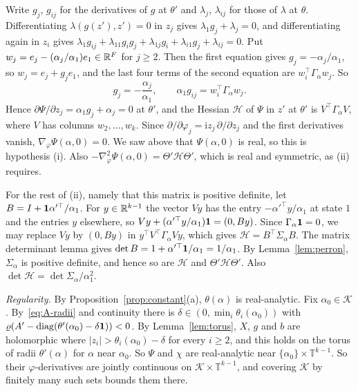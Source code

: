 Write $g_j$, $g_{ij}$ for the derivatives of $g$ at $\theta'$ and
$\lambda_j$, $\lambda_{ij}$ for those of $\lambda$ at $\theta$.
Differentiating $\lambda(g(z'),z')=0$ in $z_j$ gives
$\lambda_1g_j+\lambda_j=0$, and differentiating again in $z_i$ gives
$\lambda_1g_{ij}+\lambda_{11}g_ig_j+\lambda_{1j}g_i+\lambda_{i1}g_j
+\lambda_{ij}=0$. Put $w_j=e_j-(\alpha_j/\alpha_1)e_1\in\mathbb{R}^F$ for $j\ge2$.
Then the first equation gives $g_j=-\alpha_j/\alpha_1$, so $w_j=e_j+g_je_1$,
and the last four terms of the second equation are
$w_i^\top\Gamma_\alpha w_j$. So
\[
g_j=-\frac{\alpha_j}{\alpha_1},\qquad \alpha_1g_{ij}=w_i^\top\Gamma_\alpha w_j .
\]
Hence $\partial\Psi/\partial z_j=\alpha_1g_j+\alpha_j=0$ at $\theta'$, and the
Hessian $\mathcal H$ of $\Psi$ in $z'$ at $\theta'$ is $V^\top\Gamma_\alpha V$,
where $V$ has columns $w_2,\dots,w_k$. Since
$\partial/\partial\varphi_j=\mathrm iz_j\,\partial/\partial z_j$ and the first
derivatives vanish, $\nabla_\varphi\Psi(\alpha,0)=0$. We saw above that
$\Psi(\alpha,0)$ is real, so this is hypothesis (i). Also
$-\nabla^2_\varphi\Psi(\alpha,0)=\Theta'\mathcal H\Theta'$, which is real and
symmetric, as (ii) requires.

For the rest of (ii), namely that this matrix is positive definite, let $B=I+\mathbf{1}\alpha'^\top/\alpha_1$. For $y\in\mathbb{R}^{k-1}$ the vector
$Vy$ has the entry $-\alpha'^\top y/\alpha_1$ at state $1$ and the entries
$y$ elsewhere, so $Vy+(\alpha'^\top y/\alpha_1)\mathbf{1}=(0,By)$. Since
$\Gamma_\alpha\mathbf{1}=0$, we may replace $Vy$ by $(0,By)$ in
$y^\top V^\top\Gamma_\alpha Vy$, which gives
$\mathcal H=B^\top\Sigma_\alpha B$. The matrix determinant lemma gives
$\det B=1+\alpha'^\top\mathbf{1}/\alpha_1=1/\alpha_1$. By Lemma~\ref{lem:perron},
$\Sigma_\alpha$ is positive definite, and hence so are $\mathcal H$ and
$\Theta'\mathcal H\Theta'$. Also
$\det\mathcal H=\det\Sigma_\alpha/\alpha_1^2$.

\emph{Regularity.} By Proposition~\ref{prop:constant}(a), $\theta(\alpha)$ is
real-analytic. Fix $\alpha_0\in\mathcal K$. By~\eqref{eq:A-radii} and
continuity there is $\delta\in(0,\min_i\theta_i(\alpha_0))$ with
$\varrho(A'-\operatorname{diag}(\theta'(\alpha_0)-\delta\mathbf{1}))<0$. By
Lemma~\ref{lem:torus}, $X$, $g$ and $b$ are holomorphic where
$|z_i|>\theta_i(\alpha_0)-\delta$ for every $i\ge2$, and this holds
on the torus of radii $\theta'(\alpha)$ for $\alpha$ near $\alpha_0$. So $\Psi$
and $\chi$ are real-analytic near $\{\alpha_0\}\times\mathbb T^{k-1}$.
So their $\varphi$-derivatives are jointly continuous on
$\mathcal K\times\mathbb T^{k-1}$, and covering $\mathcal K$ by finitely many
such sets bounds them there.

